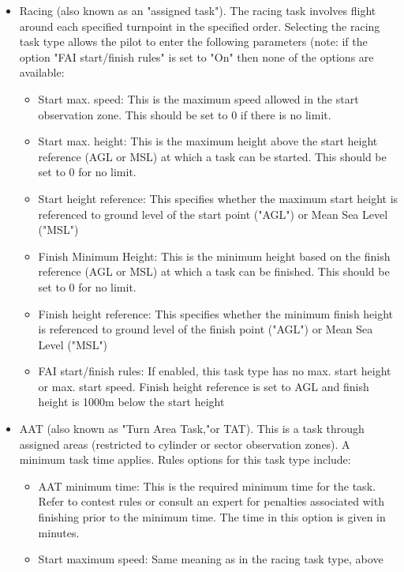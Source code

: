 \begin{itemize}
\item Racing (also known as an "assigned task").  The racing task involves flight 
around each specified turnpoint in the specified order.  Selecting the racing task 
type allows the pilot to enter the following parameters (note: if the option 
"FAI start/finish rules" is set to "On" then none of the options are available: 
  \begin{itemize}
  \item Start max. speed: This is the maximum speed allowed in the start observation 
    zone.  This should be set to 0 if there is no limit.
  \item Start max. height: This is the maximum height above the start height 
    reference (AGL or MSL) at which a task can be started.  This  should be set to 
    0 for no limit.
  \item Start height reference: This specifies whether the maximum start height is 
    referenced to ground level of the start point ("AGL") or Mean Sea Level ("MSL")
  \item Finish Minimum Height: This is the minimum height based on the finish 
    reference (AGL or MSL) at which a task can be finished.  This should be set to 
    0 for no limit.
  \item Finish height reference: This specifies whether the minimum finish height 
    is referenced to ground level of the finish point ("AGL") or Mean Sea Level ("MSL")
  \item FAI start/finish rules: If enabled, this task type has no max. start height 
    or max. start speed.  Finish height reference is set to AGL and finish height 
    is 1000m below the start height 
  \end{itemize}
\item AAT (also known as "Turn Area Task,"or TAT).  This is a task through assigned 
areas (restricted to cylinder or sector observation zones).  A minimum task time 
applies.  Rules options for this task type include:
  \begin{itemize}
  \item AAT minimum time:  This is the required minimum time for the task.  Refer 
    to contest rules or consult an expert for penalties associated with finishing 
    prior to the minimum time.  The time in this option is given in minutes.
  \item Start maximum speed: Same meaning as in the racing task type, above

\end{itemize}
\end{itemize}
